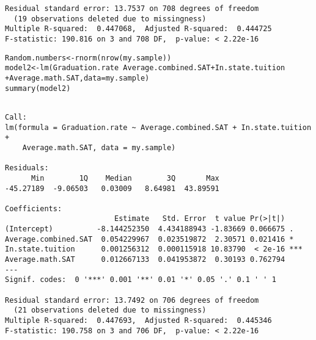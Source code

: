 \documentclass{beamer}\usepackage[]{graphicx}\usepackage[]{color}
\makeatletter
\newcommand{\hlopt}[1]{\textcolor[rgb]{1,0.894,0.769}{#1}}%
\newcommand{\hlstd}[1]{\textcolor[rgb]{1,0.894,0.769}{#1}}%
\newcommand{\hlkwb}[1]{\textcolor[rgb]{0.804,0.776,0.451}{#1}}%
\newcommand{\hlkwc}[1]{\textcolor[rgb]{0.78,0.941,0.545}{#1}}%
\newcommand{\hlkwd}[1]{\textcolor[rgb]{1,0.78,0.769}{#1}}%
\newenvironment{kframe}{%
 \def\at@end@of@kframe{}%
 \ifinner\ifhmode%
  \def\at@end@of@kframe{\end{minipage}}%
  \begin{minipage}{\columnwidth}%
 \fi\fi%
 \def\FrameCommand##1{\hskip\@totalleftmargin \hskip-\fboxsep
 \colorbox{shadecolor}{##1}\hskip-\fboxsep
     \hskip-\linewidth \hskip-\@totalleftmargin \hskip\columnwidth}%
 \MakeFramed {\advance\hsize-\width
   \@totalleftmargin\z@ \linewidth\hsize
   \@setminipage}}%
 {\par\unskip\endMakeFramed%
 \at@end@of@kframe}
\newenvironment{knitrout}{}{} %
\makeatother
\begin{document}
\begin{darkframes}
\begin{frame}[fragile]
\begin{knitrout}
\begin{kframe}
\begin{verbatim}
Residual standard error: 13.7537 on 708 degrees of freedom
  (19 observations deleted due to missingness)
Multiple R-squared:  0.447068,	Adjusted R-squared:  0.444725 
F-statistic: 190.816 on 3 and 708 DF,  p-value: < 2.22e-16
\end{verbatim}
\end{kframe}
\end{knitrout}
    \end{frame}

    \begin{frame}[fragile]
      \fontsize{8}{8}
\begin{knitrout}
\color{fgcolor}\begin{kframe}
\begin{alltt}
\hlstd{Random.numbers} \hlkwb{<-} \hlkwd{rnorm}\hlstd{(}\hlkwd{nrow}\hlstd{(my.sample))}
\hlstd{model2} \hlkwb{<-} \hlkwd{lm}\hlstd{(Graduation.rate} \hlopt{~} \hlstd{Average.combined.SAT} \hlopt{+} \hlstd{In.state.tuition}
               \hlopt{+} \hlstd{Average.math.SAT,} \hlkwc{data}\hlstd{=my.sample)}
\hlkwd{summary}\hlstd{(model2)}
\end{alltt}
\begin{verbatim}

Call:
lm(formula = Graduation.rate ~ Average.combined.SAT + In.state.tuition + 
    Average.math.SAT, data = my.sample)

Residuals:
      Min        1Q    Median        3Q       Max 
-45.27189  -9.06503   0.03009   8.64981  43.89591 

Coefficients:
                         Estimate   Std. Error  t value Pr(>|t|)    
(Intercept)          -8.144252350  4.434188943 -1.83669 0.066675 .  
Average.combined.SAT  0.054229967  0.023519872  2.30571 0.021416 *  
In.state.tuition      0.001256312  0.000115918 10.83790  < 2e-16 ***
Average.math.SAT      0.012667133  0.041953872  0.30193 0.762794    
---
Signif. codes:  0 '***' 0.001 '**' 0.01 '*' 0.05 '.' 0.1 ' ' 1

Residual standard error: 13.7492 on 706 degrees of freedom
  (21 observations deleted due to missingness)
Multiple R-squared:  0.447693,	Adjusted R-squared:  0.445346 
F-statistic: 190.758 on 3 and 706 DF,  p-value: < 2.22e-16
\end{verbatim}
\end{kframe}
\end{knitrout}
    \end{frame}


\end{darkframes}
\end{document}
